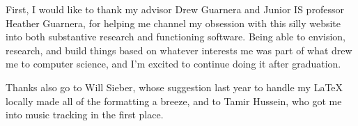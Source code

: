 \documentclass[12pt,code,palatino,picins,blacklinks,kaukecopyright,openright,oneside,final]{woosterthesis} %
\begin{document}
%                                                                                       
%                                                                                       

\dedication{This work is dedicated to the future generations of Wooster students.}


%                                                                                       
%                                                                                       


\begin{acknowl}  
	
First, I would like to thank my advisor Drew Guarnera and Junior IS professor Heather Guarnera, for helping me channel my obsession with this silly website into both substantive research and functioning software. Being able to envision, research, and build things based on whatever interests me was part of what drew me to computer science, and I'm excited to continue doing it after graduation.

Thanks also go to Will Sieber, whose suggestion last year to handle my \LaTeX{} locally made all of the formatting a breeze, and to Tamir Hussein, who got me into music tracking in the first place.

\end{acknowl}

%                                                                                       
%                                                                                       

\end{document}

